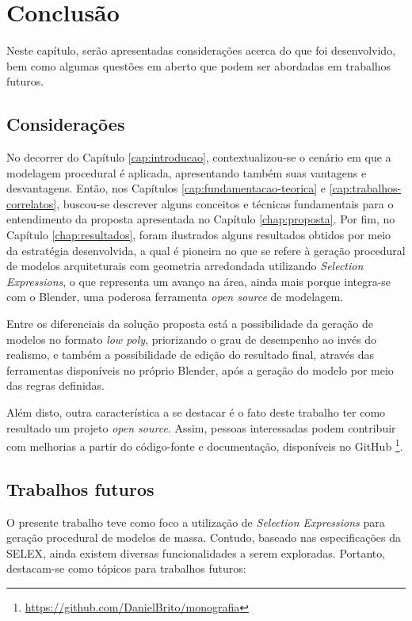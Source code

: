 \chapter{Conclusão}
\label{chap:conclusoes}

Neste capítulo, serão apresentadas considerações acerca do que foi desenvolvido, bem como algumas questões em aberto que podem ser abordadas em trabalhos futuros.

\section{Considerações}
\label{sec:consideracoes}

No decorrer do Capítulo \ref{cap:introducao}, contextualizou-se o cenário em que a modelagem procedural é aplicada, apresentando também suas vantagens e desvantagens. Então, nos Capítulos \ref{cap:fundamentacao-teorica} e \ref{cap:trabalhos-correlatos}, buscou-se descrever alguns conceitos e técnicas fundamentais para o entendimento da proposta apresentada no Capítulo \ref{chap:proposta}. Por fim, no Capítulo \ref{chap:resultados}, foram ilustrados alguns resultados obtidos por meio da estratégia desenvolvida, a qual é pioneira no que se refere à geração procedural de modelos arquiteturais com geometria arredondada utilizando \textit{Selection Expressions}, o que representa um avanço na área, ainda mais porque integra-se com o Blender, uma poderosa ferramenta \textit{open source} de modelagem.

Entre os diferenciais da solução proposta está a possibilidade da geração de modelos no formato \textit{low poly}, priorizando o grau de desempenho ao invés do realismo, e também a possibilidade de edição do resultado final, através das ferramentas disponíveis no próprio Blender, após a geração do modelo por meio das regras definidas.

Além disto, outra característica a se destacar é o fato deste trabalho ter como resultado um projeto \textit{open source}. Assim, pessoas interessadas podem contribuir com melhorias a partir do código-fonte e documentação, disponíveis no GitHub \footnote{\href{https://github.com/DanielBrito/monografia}{https://github.com/DanielBrito/monografia}}.

\section{Trabalhos futuros}
\label{sec:trabalhos_futuros}

O presente trabalho teve como foco a utilização de \textit{Selection Expressions} para geração procedural de modelos de massa. Contudo, baseado nas especificações da \gls{SELEX}, ainda existem diversas funcionalidades a serem exploradas. Portanto, destacam-se como tópicos para trabalhos futuros:

